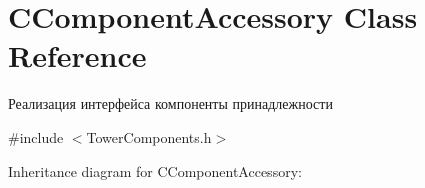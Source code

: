 \hypertarget{classCComponentAccessory}{}\section{C\+Component\+Accessory Class Reference}
\label{classCComponentAccessory}


Реализация интерфейса компоненты принадлежности  




{\ttfamily \#include $<$Tower\+Components.\+h$>$}



Inheritance diagram for C\+Component\+Accessory\+:
